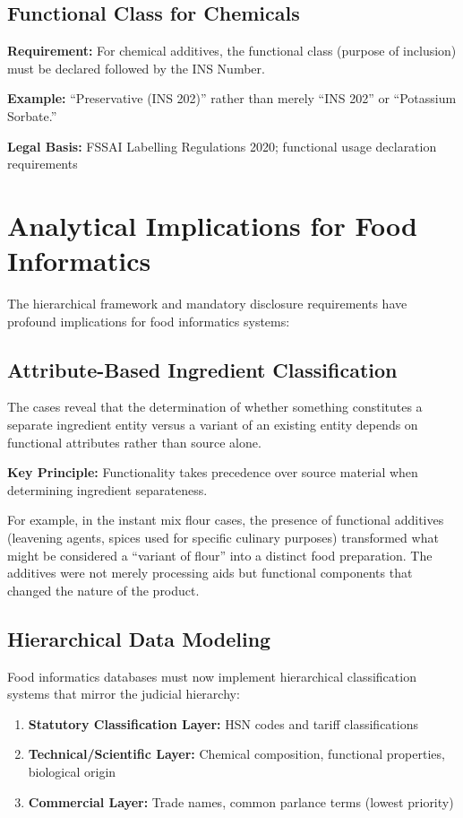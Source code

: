 \documentclass[12pt,a4paper]{article}
\begin{document}
\subsection{Functional Class for Chemicals}

\textbf{Requirement:} For chemical additives, the functional class (purpose of inclusion) must be declared followed by the INS Number.

\textbf{Example:} ``Preservative (INS 202)'' rather than merely ``INS 202'' or ``Potassium Sorbate.''

\textbf{Legal Basis:} FSSAI Labelling Regulations 2020; functional usage declaration requirements

\section{Analytical Implications for Food Informatics}

The hierarchical framework and mandatory disclosure requirements have profound implications for food informatics systems:

\subsection{Attribute-Based Ingredient Classification}

The cases reveal that the determination of whether something constitutes a separate ingredient entity versus a variant of an existing entity depends on functional attributes rather than source alone.

\textbf{Key Principle:} Functionality takes precedence over source material when determining ingredient separateness.

For example, in the instant mix flour cases, the presence of functional additives (leavening agents, spices used for specific culinary purposes) transformed what might be considered a ``variant of flour'' into a distinct food preparation. The additives were not merely processing aids but functional components that changed the nature of the product.

\subsection{Hierarchical Data Modeling}

Food informatics databases must now implement hierarchical classification systems that mirror the judicial hierarchy:

\begin{enumerate}
\item \textbf{Statutory Classification Layer:} HSN codes and tariff classifications
\item \textbf{Technical/Scientific Layer:} Chemical composition, functional properties, biological origin
\item \textbf{Commercial Layer:} Trade names, common parlance terms (lowest priority)
\end{enumerate}
\end{document}
